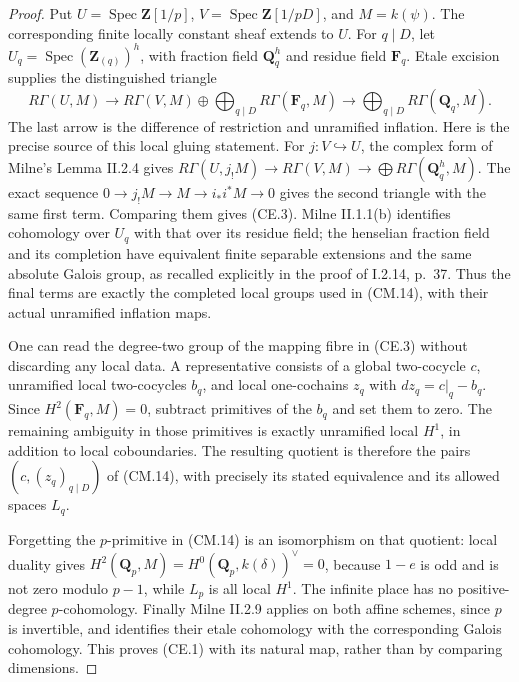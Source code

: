 \documentclass[11pt,a4paper]{article}
\theoremstyle{definition}
\begin{document}
\begin{proof}
Put \(U=\operatorname{Spec}\mathbf Z[1/p]\),
\(V=\operatorname{Spec}\mathbf Z[1/pD]\), and \(M=k(\psi)\).
The corresponding finite locally constant sheaf extends to \(U\).
For \(q\mid D\), let \(U_q=\operatorname{Spec}(\mathbf Z_{(q)})^h\),
with fraction field \(\mathbf Q_q^h\) and residue field \(\mathbf F_q\).
Etale excision supplies the distinguished triangle
\[
 R\Gamma(U,M)\longrightarrow
 R\Gamma(V,M)\oplus\bigoplus_{q\mid D}R\Gamma(\mathbf F_q,M)
 \longrightarrow\bigoplus_{q\mid D}R\Gamma(\mathbf Q_q,M).
                                                        \tag{CE.3}
\]
The last arrow is the difference of restriction and unramified
inflation.  Here is the precise source of this local gluing statement.
For \(j:V\hookrightarrow U\), the complex form of Milne's
Lemma II.2.4 gives
\(R\Gamma(U,j_!M)\to R\Gamma(V,M)\to
\bigoplus R\Gamma(\mathbf Q_q^h,M)\).
The exact sequence \(0\to j_!M\to M\to i_*i^*M\to0\)
gives the second triangle with the same first term.
Comparing them gives (CE.3).
Milne II.1.1(b) identifies cohomology over \(U_q\) with that over
its residue field; the henselian fraction field and its completion
have equivalent finite separable extensions and the same absolute
Galois group, as recalled explicitly in the proof of I.2.14, p.~37.
Thus the final terms are exactly the completed local groups used
in (CM.14), with their actual unramified inflation maps.

One can read the degree-two group of the mapping fibre in (CE.3)
without discarding any local data.  A representative consists of
a global two-cocycle \(c\), unramified local two-cocycles \(b_q\),
and local one-cochains \(z_q\) with
\(dz_q=c|_q-b_q\).
Since \(H^2(\mathbf F_q,M)=0\), subtract primitives of the \(b_q\)
and set them to zero.  The remaining ambiguity in those primitives
is exactly unramified local \(H^1\), in addition to local
coboundaries.  The resulting quotient is therefore the pairs
\((c,(z_q)_{q\mid D})\) of (CM.14), with precisely its stated
equivalence and its allowed spaces \(L_q\).

Forgetting the \(p\)-primitive in (CM.14) is an isomorphism on
that quotient: local duality gives
\(H^2(\mathbf Q_p,M)=H^0(\mathbf Q_p,k(\delta))^\vee=0\),
because \(1-e\) is odd and is not zero modulo \(p-1\), while
\(L_p\) is all local \(H^1\).  The infinite place has no
positive-degree \(p\)-cohomology.  Finally Milne II.2.9 applies
on both affine schemes, since \(p\) is invertible, and identifies
their etale cohomology with the corresponding Galois cohomology.
This proves (CE.1) with its natural map, rather than by comparing
dimensions.


\end{proof}
\end{document}
